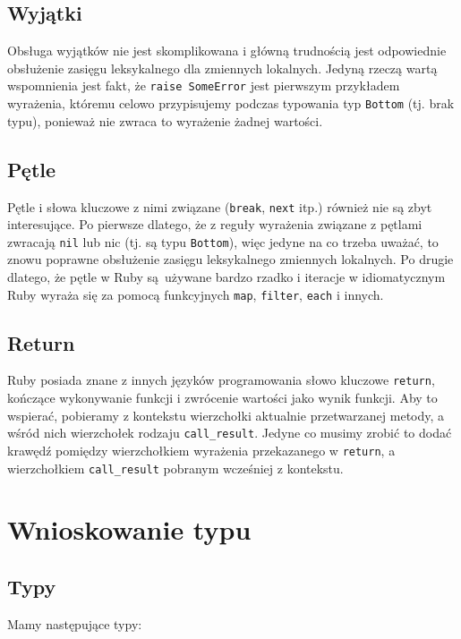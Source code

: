\documentclass[shortabstract,mgr]{iithesis}
\begin{document}
\section{Wyjątki}

Obsługa wyjątków nie jest skomplikowana i główną trudnością jest odpowiednie obsłużenie zasięgu leksykalnego dla zmiennych lokalnych. Jedyną rzeczą wartą wspomnienia jest fakt, że \texttt{raise SomeError} jest pierwszym przykładem wyrażenia, któremu celowo przypisujemy podczas typowania typ \texttt{Bottom} (tj. brak typu), ponieważ nie zwraca to wyrażenie żadnej wartości.

\section{Pętle}

Pętle i słowa kluczowe z nimi związane (\texttt{break}, \texttt{next} itp.) również nie są zbyt interesujące. Po pierwsze dlatego, że z reguły wyrażenia związane z pętlami zwracają \texttt{nil} lub nic (tj. są typu \texttt{Bottom}), więc jedyne na co trzeba uważać, to znowu poprawne obsłużenie zasięgu leksykalnego zmiennych lokalnych. Po drugie dlatego, że pętle w Ruby są używane bardzo rzadko i iteracje w idiomatycznym Ruby wyraża się za pomocą funkcyjnych \texttt{map}, \texttt{filter}, \texttt{each} i innych.

\section{Return}

Ruby posiada znane z innych języków programowania słowo kluczowe \texttt{return}, kończące wykonywanie funkcji i zwrócenie wartości jako wynik funkcji. Aby to wspierać, pobieramy z kontekstu wierzchołki aktualnie przetwarzanej metody, a wśród nich wierzchołek rodzaju \texttt{call\_result}. Jedyne co musimy zrobić to dodać krawędź pomiędzy wierzchołkiem wyrażenia przekazanego w \texttt{return}, a wierzchołkiem \texttt{call\_result} pobranym wcześniej z kontekstu.


\chapter{Wnioskowanie typu}

\section{Typy}

Mamy następujące typy:
\end{document}
